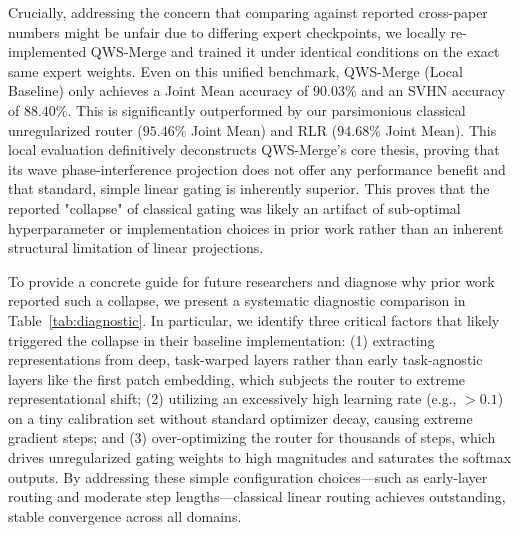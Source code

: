 Crucially, addressing the concern that comparing against reported cross-paper numbers might be unfair due to differing expert checkpoints, we locally re-implemented QWS-Merge and trained it under identical conditions on the exact same expert weights. Even on this unified benchmark, QWS-Merge (Local Baseline) only achieves a Joint Mean accuracy of $90.03\%$ and an SVHN accuracy of $88.40\%$. This is significantly outperformed by our parsimonious classical unregularized router ($95.46\%$ Joint Mean) and RLR ($94.68\%$ Joint Mean). This local evaluation definitively deconstructs QWS-Merge's core thesis, proving that its wave phase-interference projection does not offer any performance benefit and that standard, simple linear gating is inherently superior. This proves that the reported "collapse" of classical gating was likely an artifact of sub-optimal hyperparameter or implementation choices in prior work rather than an inherent structural limitation of linear projections. 

To provide a concrete guide for future researchers and diagnose why prior work reported such a collapse, we present a systematic diagnostic comparison in Table~\ref{tab:diagnostic}. In particular, we identify three critical factors that likely triggered the collapse in their baseline implementation: (1) extracting representations from deep, task-warped layers rather than early task-agnostic layers like the first patch embedding, which subjects the router to extreme representational shift; (2) utilizing an excessively high learning rate (e.g., $>0.1$) on a tiny calibration set without standard optimizer decay, causing extreme gradient steps; and (3) over-optimizing the router for thousands of steps, which drives unregularized gating weights to high magnitudes and saturates the softmax outputs. By addressing these simple configuration choices—such as early-layer routing and moderate step lengths—classical linear routing achieves outstanding, stable convergence across all domains.

